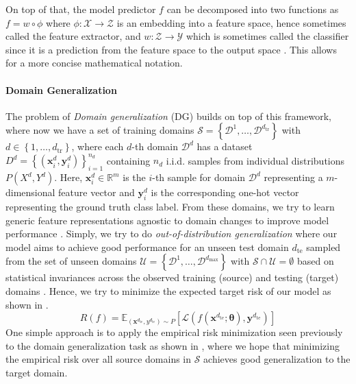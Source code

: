 On top of that, the model predictor $f$ can be decomposed into two functions as $f=w \circ \phi$ where $\phi: \mathcal{X} \rightarrow \mathcal{Z}$ is an embedding into a feature space, hence sometimes called the feature extractor, and $w: \mathcal{Z} \rightarrow \mathcal{Y}$ which is sometimes called the classifier since it is a prediction from the feature space to the output space \citep{gulrajani2020search, MotiianPAD17}. This allows for a more concise mathematical notation.

\paragraph{Domain Generalization}
The problem of \emph{Domain generalization} (DG) builds on top of this framework, where now we have a set of training domains $\mathcal{S} = \left\{\mathcal{D}^{1}, \ldots, \mathcal{D}^{d_{\mathrm{tr}}}\right\}$ with $d \in\left\{1, \ldots, d_{\mathrm{tr}}\right\}$, where each $d$-th domain $\mathcal{D}^d$ has a dataset $D^{d}=\left\{\left(\mathbf{x}_{i}^{d}, \mathbf{y}_{i}^{d}\right)\right\}_{i=1}^{n_{d}}$ containing $n_d$ i.i.d. samples from individual distributions $P\left(X^{d}, Y^{d}\right)$. Here, $\mathbf{x}_i^d \in \mathbb{R}^{m}$ is the $i$-th sample for domain $\mathcal{D}^d$ representing a $m$-dimensional feature vector and $\mathbf{y}_i^d$ is the corresponding one-hot vector representing the ground truth class label. From these domains, we try to learn generic feature representations agnostic to domain changes to improve model performance \citep{seo2019learning}. Simply, we try to do \emph{out-of-distribution generalization} where our model aims to achieve good performance for an unseen test domain $d_\mathrm{te}$ sampled from the set of unseen domains $\mathcal{U} = \left\{\mathcal{D}^{1}, \ldots, \mathcal{D}^{d_{\mathrm{max}}}\right\}$ with $\mathcal{S} \cap \mathcal{U}=\emptyset$ based on statistical invariances across the observed training (source) and testing (target) domains \citep{gulrajani2020search, huang2020selfchallenging}. Hence, we try to minimize the expected target risk of our model as shown in .
\begin{equation}
\label{eq:domain_risk}
    R(f) = \mathbb{E}_{(\mathbf{x}^{d_{\mathrm{te}}}, y^{d_{\mathrm{te}}}) \sim P}[\mathcal{L}(f(\mathbf{x}^{d_{\mathrm{te}}}; \boldsymbol{\theta}), \mathbf{y}^{d_{\mathrm{te}}})]
\end{equation}
One simple approach is to apply the empirical risk minimization seen previously to the domain generalization task as shown in , where we hope that minimizing the empirical risk over all source domains in $\mathcal{S}$ achieves good generalization to the target domain.

